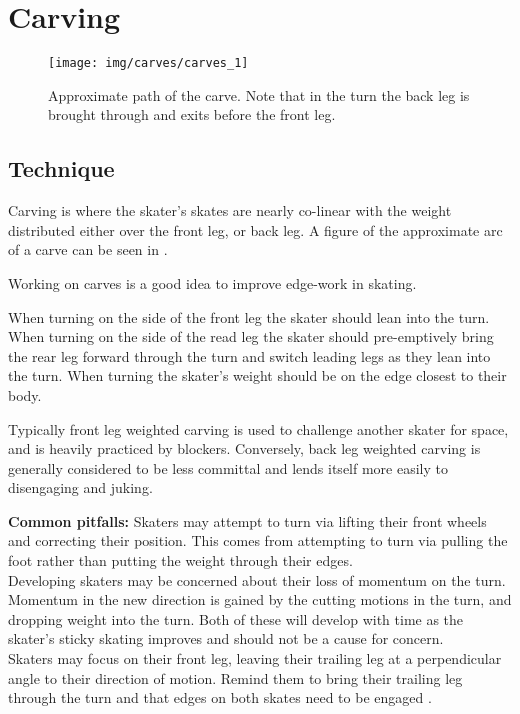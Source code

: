 \section{Carving}
\label{sec:sticky/carves}


\begin{figure}
\centering
\texttt{[image: img/carves/carves\_1]}
\caption{Approximate path of the carve. Note that in the turn the back leg is brought through and exits before the front leg. \label{fig:carves}}
\end{figure}

\subsection*{Technique}

Carving is where the skater's skates are nearly co-linear with the weight distributed either over the front leg, or back leg.
A figure of the approximate arc of a carve can be seen in .


Working on carves is a good idea to improve edge-work in skating.  


When turning on the side of the front leg the skater should lean into the turn.  
When turning on the side of the read leg the skater should pre-emptively bring the rear leg forward through the turn and switch leading legs as they lean into the turn.  
When turning the skater's weight should be on the edge closest to their body.   


Typically front leg weighted carving is used to challenge another skater for space, and is heavily practiced by blockers.     
Conversely, back leg weighted carving is generally considered to be less committal and lends itself more easily to disengaging and juking.


{\bf Common pitfalls:}
Skaters may attempt to turn via lifting their front wheels and correcting their position.
This comes from attempting to turn via pulling the foot rather than putting the weight through their edges. \\ 



Developing skaters may be concerned about their loss of momentum on the turn. 
Momentum in the new direction is gained by the cutting motions in the turn, and dropping weight into the turn.   
Both of these will develop with time as the skater's sticky skating improves and should not be a cause for concern. \\ 

Skaters may focus on their front leg, leaving their trailing leg at a perpendicular angle to their direction of motion.   
Remind them to bring their trailing leg through the turn and that edges on both skates need to be engaged .

